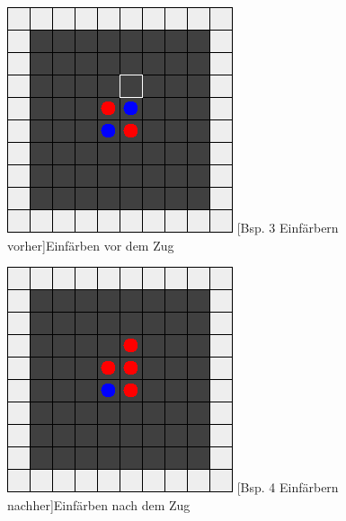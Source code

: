 \documentclass[12pt,a4paper,bibliography=totocnumbered,listof=totocnumbered]{article}
\begin{document}
\vspace{1em}
\begin{figure}[h]
\centering
\begin{minipage}[c]{0.4\textwidth}
	\centering
	\includegraphics[width=\textwidth]{pics/reversi_original_map_capture_1.png}
	[Bsp. 3 Einfärbern vorher]{Einfärben vor dem Zug}
	\label{fig:capture_pre}
\end{minipage}
\begin{minipage}[c]{0.4\textwidth}
	\centering
	\includegraphics[width=\textwidth]{pics/reversi_original_map_capture_2.png}
	[Bsp. 4 Einfärbern nachher]{Einfärben nach dem Zug}
	\label{fig:capture_post}
\end{minipage}
\end{figure}
\end{document}
